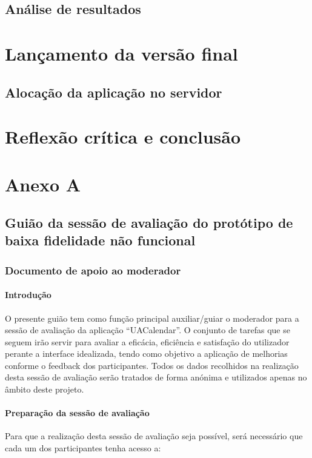 \documentclass[11pt, twoside]{report}
\begin{document}
	\section{Análise de resultados}
	
	\chapter{Lançamento da versão final}
	\section{Alocação da aplicação no servidor}
	
	
	\chapter{Reflexão crítica e conclusão}
	
	

	
	
	\pagestyle{empty}
	
	\chapter*{Anexo A}
		\section*{Guião da sessão de avaliação do protótipo de baixa fidelidade não funcional}
		\subsection*{Documento de apoio ao moderador}
			
		
		\subsubsection*{Introdução}
	O presente guião tem como função principal auxiliar/guiar o moderador para a sessão de avaliação da aplicação “UACalendar”. O conjunto de tarefas que se seguem irão servir para avaliar a eficácia, eficiência e satisfação do utilizador perante a interface idealizada, tendo como objetivo a aplicação de melhorias conforme o feedback dos participantes.
	Todos os dados recolhidos na realização desta sessão de avaliação serão tratados de forma anónima e utilizados apenas no âmbito deste projeto.
		
		
	\subsubsection*{Preparação da sessão de avaliação}
			Para que a realização desta sessão de avaliação seja possível, será necessário que cada um dos participantes tenha acesso a:
	
\end{document}
